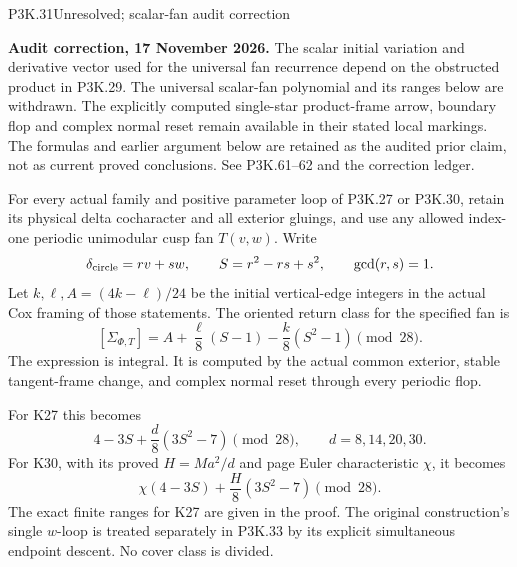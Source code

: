 \begin{statement}{P3K.31}{Unresolved; scalar-fan audit correction}
\par\noindent\textbf{Audit correction, 17 November 2026.} The scalar initial variation and derivative vector used for the universal fan recurrence depend on the obstructed product in P3K.29. The universal scalar-fan polynomial and its ranges below are withdrawn. The explicitly computed single-star product-frame arrow, boundary flop and complex normal reset remain available in their stated local markings. The formulas and earlier argument below are retained as the audited prior claim, not as current proved conclusions. See P3K.61--62 and the correction ledger.
\medskip

For every actual family and positive parameter loop of P3K.27 or
P3K.30, retain its physical delta cocharacter and all exterior
gluings, and use any allowed index-one periodic unimodular cusp
fan \(T(v,w)\). Write
\[
 \delta_{\rm circle}=r v+s w,\qquad
 S=r^2-rs+s^2,\qquad \gcd(r,s)=1.
\]
Let \(k,\ell,A=(4k-\ell)/24\) be the initial vertical-edge
integers in the actual Cox framing of those statements.
The oriented return class for the specified fan is
\[
 [\Sigma_{\Phi,T}]
    =A+\frac{\ell}{8}(S-1)-\frac{k}{8}(S^2-1)
        \pmod{28}.                                      \tag{P3K.31.0}
\]
The expression is integral. It is computed by the actual common
exterior, stable tangent-frame change, and complex normal reset
through every periodic flop.

For K27 this becomes
\[
           4-3S+\frac d8(3S^2-7)\pmod{28},
       \qquad d=8,14,20,30.
\]
For K30, with its proved \(H=Ma^2/d\) and page Euler characteristic
\(\chi\), it becomes
\[
                 \chi(4-3S)+\frac H8(3S^2-7)\pmod{28}.
\]
The exact finite ranges for K27 are given in the proof.
 The original construction's single \(w\)-loop is treated separately
 in P3K.33 by its explicit simultaneous endpoint descent. No cover
 class is divided.
\end{statement}
